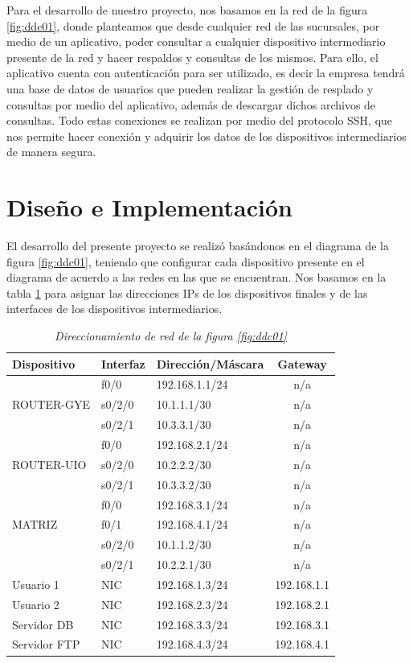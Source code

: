 \documentclass[conference]{IEEEtran}
\begin{document}
Para el desarrollo de nuestro proyecto, nos basamos en la red de la figura \ref{fig:ddc01}, donde planteamos que desde cualquier red de las sucursales, por medio de un aplicativo, poder consultar a cualquier dispositivo intermediario presente de la red y hacer respaldos y consultas de los mismos. Para ello, el aplicativo cuenta con autenticación para ser utilizado, es decir la empresa tendrá una base de datos de usuarios que pueden realizar la gestión de resplado y consultas por medio del aplicativo, además de descargar dichos archivos de consultas. Todo estas conexiones se realizan por medio del protocolo SSH, que nos permite hacer conexión y adquirir los datos de los dispositivos intermediarios de manera segura. 

\section{Diseño e Implementación}
El desarrollo del presente proyecto se realizó basándonos en el diagrama de la figura \ref{fig:ddc01}, teniendo que configurar cada dispositivo presente en el diagrama de acuerdo a las redes en las que se encuentran. Nos basamos en la tabla \ref{tab:dir01} para asignar las direcciones IPs de los dispositivos finales y de las interfaces de los dispositivos intermediarios. \\
\begin{table}[h]
\begin{center}
	\begin{tabular}{|l|l|l|c|}
	\hline
	\textbf{Dispositivo} &\textbf{Interfaz} &\textbf{Dirección/Máscara} &\textbf{ Gateway }\\ \hline
	\multirow{3}{*}{ROUTER-GYE}& f0/0 & 192.168.1.1/24 & n/a\\ \cline{2-4}
	&s0/2/0  &10.1.1.1/30 & n/a \\ \cline{2-4}
	&s0/2/1 &10.3.3.1/30 & n/a\\ \hline
	\multirow{3}{*}{ROUTER-UIO}& f0/0 & 192.168.2.1/24 & n/a\\ \cline{2-4}
	&s0/2/0  &10.2.2.2/30 & n/a \\ \cline{2-4}
	&s0/2/1 &10.3.3.2/30 & n/a\\ \hline
	\multirow{3}{*}{MATRIZ}& f0/0 & 192.168.3.1/24 & n/a\\ \cline{2-4}
	& f0/1 & 192.168.4.1/24 & n/a\\ \cline{2-4}
	&s0/2/0  &10.1.1.2/30 & n/a \\ \cline{2-4}
	&s0/2/1 &10.2.2.1/30 & n/a\\ \hline
	Usuario 1 & NIC & 192.168.1.3/24 &192.168.1.1 \\\hline
	Usuario 2 & NIC & 192.168.2.3/24 &192.168.2.1 \\\hline
	Servidor DB & NIC & 192.168.3.3/24 &192.168.3.1 \\\hline
	Servidor FTP & NIC & 192.168.4.3/24 &192.168.4.1 \\\hline
\end{tabular}\vspace{0.25cm}
\caption{\textit{Direccionamiento de red de la figura \ref{fig:ddc01}}}
\label{tab:dir01}
\end{center}
\end{table}\\
\end{document}
